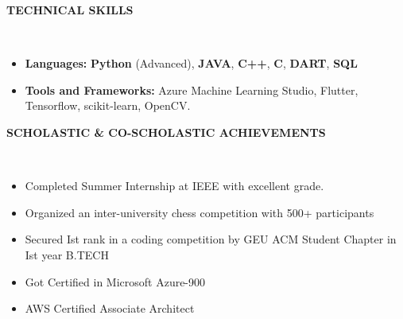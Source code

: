 \documentclass[a4paper,10pt]{article}
\newcommand{\lsep}{-0.5cm}
\newcommand{\resheading}[1]{{\small \colorbox{mygrey}{\begin{minipage}{0.98\textwidth}{\textbf{#1 \vphantom{p\^{E}}}}\end{minipage}}}}
\begin{document}
\resheading{\textbf{TECHNICAL SKILLS} }\\[\lsep]
\begin{itemize}[itemsep=0.1mm, parsep=0pt]
\item \noindent \textbf{Languages:} \textbf{Python} (Advanced), \textbf{JAVA}, \textbf{C++}, \textbf{C}, \textbf{DART},  \textbf{SQL}
\item \noindent\textbf{Tools and Frameworks:} Azure Machine Learning Studio, Flutter, Tensorflow, scikit-learn, OpenCV.
\end{itemize}

\resheading{\textbf{SCHOLASTIC \& CO-SCHOLASTIC ACHIEVEMENTS} }\\[\lsep]
\begin{itemize}[itemsep=0.01mm, parsep=2pt]
\item \noindent Completed Summer Internship at IEEE with excellent grade.
\item \noindent Organized an inter-university chess competition with 500+ participants
\item \noindent Secured Ist rank in a coding competition by GEU ACM Student Chapter in Ist year B.TECH
\item \noindent Got Certified in Microsoft Azure-900
\item \noindent AWS Certified Associate Architect
\end{itemize}
\end{document}
